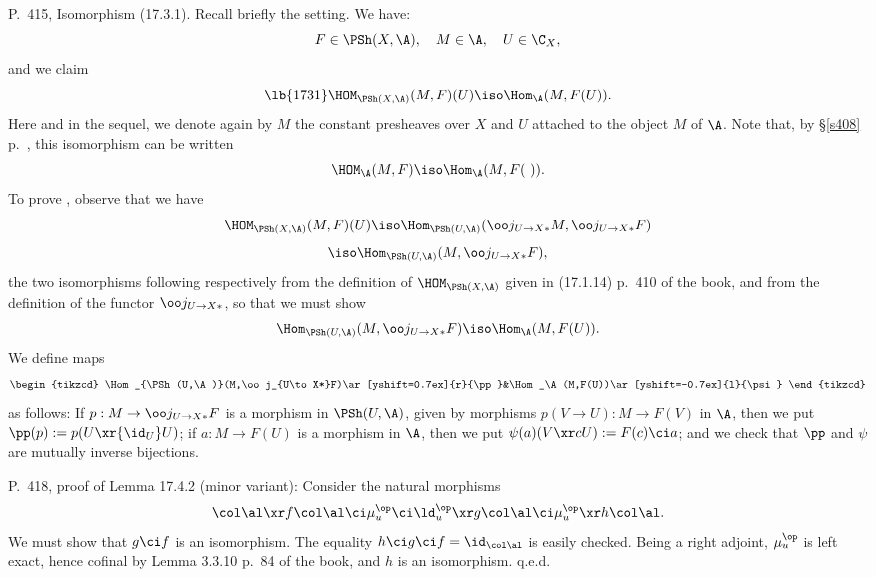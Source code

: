 \documentclass[12pt]{article}
\theoremstyle{remark}
\theoremstyle{definition}
\begin{document}
%

\begin{s}
P.~415, Isomorphism (17.3.1). Recall briefly the setting. We have: 
$$
F\in\PSh(X,\A),\quad M\in\A,\quad U\in\C_X,
$$ 
and we claim 
%
\begin{equation}\lb{1731}
\HOM_{\PSh(X,\A)}(M,F)(U)\iso\Hom_\A(M,F(U)).
\end{equation} 
%
Here and in the sequel, we denote again by $M$ the constant presheaves over $X$ and $U$ attached to the object $M$ of $\A$. Note that, by \S\ref{s408} p.~, this isomorphism can be written 
$$
\HOM_\A(M,F)\iso\Hom_\A(M,F(\ )).
$$ 
To prove , observe that we have  
$$
\HOM_{\PSh(X,\A)}(M,F)(U)\iso\Hom_{\PSh(U,\A)}(\oo j_{U\to X*}M,\oo j_{U\to X*}F)
$$ 
$$
\iso\Hom_{\PSh(U,\A)}(M,\oo j_{U\to X*}F), 
$$ 
the two isomorphisms following respectively from the definition of $\HOM_{\PSh(X,\A)}$ given in (17.1.14) p.~410 of the book, and from the definition of the functor $\oo j_{U\to X*}$, so that we must show 
$$
\Hom_{\PSh(U,\A)}(M,\oo j_{U\to X*}F)\iso\Hom_\A(M,F(U)).
$$
We define maps 
$$
\begin{tikzcd}
\Hom_{\PSh(U,\A)}(M,\oo j_{U\to X*}F)\ar[yshift=0.7ex]{r}{\pp}&\Hom_\A(M,F(U))\ar[yshift=-0.7ex]{l}{\psi}
\end{tikzcd} 
$$ 
as follows: If $p:M\to\oo j_{U\to X*}F$ is a morphism in $\PSh(U,\A)$, given by morphisms $p(V\to U):M\to F(V)$ in $\A$, then we put $\pp(p):=p(U\xr{\id_U}U)$; if $a:M\to F(U)$ is a morphism in $\A$, then we put $\psi(a)(V\xr cU):=F(c)\ci a$; and we check that $\pp$ and $\psi$ are mutually inverse bijections. 
\end{s}

%

\begin{s} 
P.~418, proof of Lemma 17.4.2 (minor variant): Consider the natural morphisms 
$$
\col\al\xr f\col\al\ci\mu_u^{\op}\ci\ld_u^{\op}\xr g\col\al\ci\mu_u^{\op}\xr h\col\al.
$$
We must show that $g\ci f$ is an isomorphism. The equality $h\ci g\ci f=\id_{\col\al}$ is easily checked. Being a right adjoint, $\mu_u^{\op}$ is left exact, hence cofinal by Lemma 3.3.10 p.~84 of the book, and $h$ is an isomorphism. q.e.d.
\end{s}  

%
\end{document}
